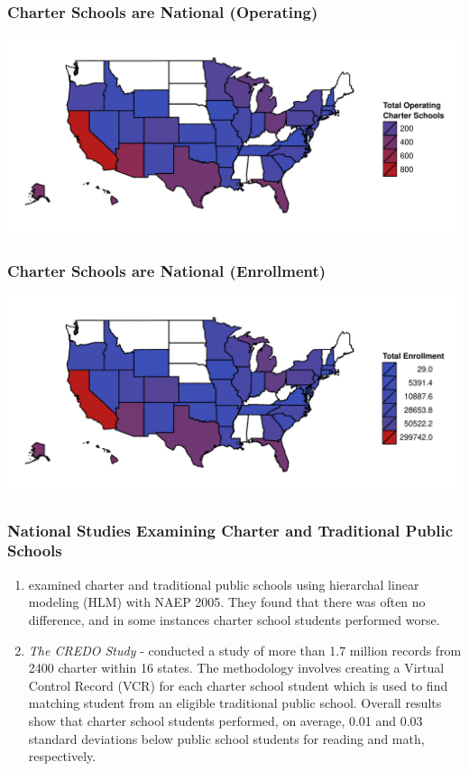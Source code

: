 \documentclass[10pt,slidestop,mathserif]{beamer}
\begin{document}
\begin{frame}[c]
	\frametitle{Charter Schools are National (Operating)}
	\includegraphics[width=\textwidth]{../Figures/CharterMapOperating.pdf}
\end{frame}

\begin{frame}[c]
	\frametitle{Charter Schools are National (Enrollment)}
	\includegraphics[width=\textwidth]{../Figures/CharterMapEnrollment}
\end{frame}

\begin{frame}[c]
	\frametitle{National Studies Examining Charter and Traditional Public Schools}
	\begin{enumerate}
		\item {} examined charter and traditional public schools using hierarchal linear modeling (HLM) with NAEP 2005. They found that there was often no difference, and in some instances charter school students performed worse.
		\pause
		\item \textit{The CREDO Study} -  conducted a study of more than 1.7 million records from 2400 charter within 16 states. The methodology involves creating a Virtual Control Record (VCR) for each charter school student which is used to find matching student from an eligible traditional public school.
		Overall results show that charter school students performed, on average, 0.01 and 0.03 standard deviations below public school students for reading and math, respectively.
	\end{enumerate}
\end{frame}
\end{document}
